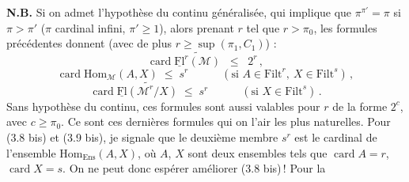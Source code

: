 \documentclass[11pt]{article}
\newcommand{\uFl}{\underline{\mathrm{Fl}}}
\newcommand{\Filt}{\mathrm{Filt}}
\newcommand{\cM}{\mathcal{M}}
\newcommand{\card}{\operatorname{card}}
\begin{document}
\textbf{N.B.} Si on admet l'hypothèse du continu généralisée, qui implique que $\pi^{\pi'}=\pi$ si $\pi>\pi'$ ($\pi$ cardinal infini, $\pi'\geq1$), alors prenant $r$ tel que $r>\pi_0$, les formules précédentes donnent (avec de plus $r\geq\sup(\pi_1,C_1)$) :
\[
\card\widetilde{\uFl^r(\cM)} \;\;\leq\;\; 2^r\,,
\tag*{(3.7 bis)}
\]
\[
\card\mathrm{Hom}_{\cM}(A,X) \;\leq\; s^r \qquad\quad (\text{si } A\in\Filt^r,\ X\in\Filt^s)\,,
\tag*{(3.8 bis)}
\]
\[
\card\widetilde{\uFl(\cM^r/X)} \;\leq\; s^r \qquad\quad (\text{si } X\in\Filt^s)\,.
\tag*{(3.9 bis)}
\]
Sans hypothèse du continu, ces formules sont aussi valables pour $r$ de la forme $2^c$, avec $c\geq\pi_0$. Ce sont ces dernières formules qui on l'air les plus naturelles. Pour (3.8 bis) et %
(3.9 bis), je signale que le deuxième membre $s^r$ est le cardinal de l'ensemble $\mathrm{Hom}_{\mathrm{Ens}}(A,X)$, où $A$, $X$ sont deux ensembles tels que $\card A=r$, $\card X=s$. On ne peut donc espérer améliorer (3.8 bis)\,! Pour la
\end{document}
